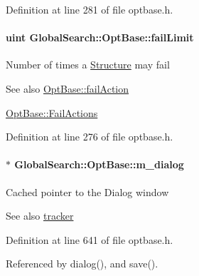 Definition at line 281 of file optbase.\+h.

\hypertarget{classGlobalSearch_1_1OptBase_aec8bb712a35c23ab79608a5d70f52b90}{}
\paragraph[{fail\+Limit}]{\setlength{\rightskip}{0pt plus 5cm}uint Global\+Search\+::\+Opt\+Base\+::fail\+Limit}\label{classGlobalSearch_1_1OptBase_aec8bb712a35c23ab79608a5d70f52b90}
Number of times a \hyperlink{classGlobalSearch_1_1Structure}{Structure} may fail \begin{DoxySeeAlso}{See also}
\hyperlink{classGlobalSearch_1_1OptBase_adda17a1eab956c00c6b14ab3ae451b91}{Opt\+Base\+::fail\+Action} 

\hyperlink{classGlobalSearch_1_1OptBase_a970b328cd0a36335c34c6b24c6ac2775}{Opt\+Base\+::\+Fail\+Actions} 
\end{DoxySeeAlso}


Definition at line 276 of file optbase.\+h.

\hypertarget{classGlobalSearch_1_1OptBase_a4673e81b57e648320474bf3024906161}{}
\paragraph[{m\+\_\+dialog}]{$\ast$ Global\+Search\+::\+Opt\+Base\+::m\+\_\+dialog\hspace{0.3cm}{\ttfamily [protected]}}\label{classGlobalSearch_1_1OptBase_a4673e81b57e648320474bf3024906161}
Cached pointer to the Dialog window \begin{DoxySeeAlso}{See also}
\hyperlink{classGlobalSearch_1_1OptBase_a304d0d10064bd3913c8089aca76067d6}{tracker} 
\end{DoxySeeAlso}


Definition at line 641 of file optbase.\+h.



Referenced by dialog(), and save().

\hypertarget{classGlobalSearch_1_1OptBase_af9223062bbb616246d5bf60ad29e1c7d}{}
